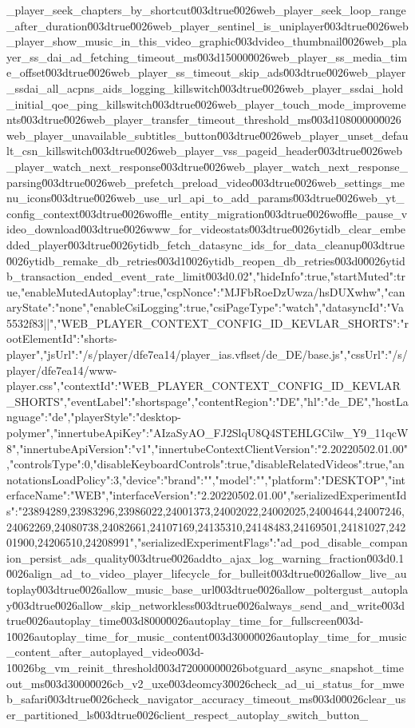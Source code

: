 {_player_seek_chapters_by_shortcut\u003dtrue\u0026web_player_seek_loop_range_after_duration\u003dtrue\u0026web_player_sentinel_is_uniplayer\u003dtrue\u0026web_player_show_music_in_this_video_graphic\u003dvideo_thumbnail\u0026web_player_ss_dai_ad_fetching_timeout_ms\u003d15000\u0026web_player_ss_media_time_offset\u003dtrue\u0026web_player_ss_timeout_skip_ads\u003dtrue\u0026web_player_ssdai_all_acpns_aids_logging_killswitch\u003dtrue\u0026web_player_ssdai_hold_initial_qoe_ping_killswitch\u003dtrue\u0026web_player_touch_mode_improvements\u003dtrue\u0026web_player_transfer_timeout_threshold_ms\u003d10800000\u0026web_player_unavailable_subtitles_button\u003dtrue\u0026web_player_unset_default_csn_killswitch\u003dtrue\u0026web_player_vss_pageid_header\u003dtrue\u0026web_player_watch_next_response\u003dtrue\u0026web_player_watch_next_response_parsing\u003dtrue\u0026web_prefetch_preload_video\u003dtrue\u0026web_settings_menu_icons\u003dtrue\u0026web_use_url_api_to_add_params\u003dtrue\u0026web_yt_config_context\u003dtrue\u0026woffle_entity_migration\u003dtrue\u0026woffle_pause_video_download\u003dtrue\u0026www_for_videostats\u003dtrue\u0026ytidb_clear_embedded_player\u003dtrue\u0026ytidb_fetch_datasync_ids_for_data_cleanup\u003dtrue\u0026ytidb_remake_db_retries\u003d1\u0026ytidb_reopen_db_retries\u003d0\u0026ytidb_transaction_ended_event_rate_limit\u003d0.02","hideInfo":true,"startMuted":true,"enableMutedAutoplay":true,"cspNonce":"MJFbRoeDzUwza/hsDUXwhw","canaryState":"none","enableCsiLogging":true,"csiPageType":"watch","datasyncId":"Va5532f83||"},"WEB_PLAYER_CONTEXT_CONFIG_ID_KEVLAR_SHORTS":{"rootElementId":"shorts-player","jsUrl":"/s/player/dfe7ea14/player_ias.vflset/de_DE/base.js","cssUrl":"/s/player/dfe7ea14/www-player.css","contextId":"WEB_PLAYER_CONTEXT_CONFIG_ID_KEVLAR_SHORTS","eventLabel":"shortspage","contentRegion":"DE","hl":"de_DE","hostLanguage":"de","playerStyle":"desktop-polymer","innertubeApiKey":"AIzaSyAO_FJ2SlqU8Q4STEHLGCilw_Y9_11qcW8","innertubeApiVersion":"v1","innertubeContextClientVersion":"2.20220502.01.00","controlsType":0,"disableKeyboardControls":true,"disableRelatedVideos":true,"annotationsLoadPolicy":3,"device":{"brand":"","model":"","platform":"DESKTOP","interfaceName":"WEB","interfaceVersion":"2.20220502.01.00"},"serializedExperimentIds":"23894289,23983296,23986022,24001373,24002022,24002025,24004644,24007246,24062269,24080738,24082661,24107169,24135310,24148483,24169501,24181027,24201900,24206510,24208991","serializedExperimentFlags":"ad_pod_disable_companion_persist_ads_quality\u003dtrue\u0026addto_ajax_log_warning_fraction\u003d0.1\u0026align_ad_to_video_player_lifecycle_for_bulleit\u003dtrue\u0026allow_live_autoplay\u003dtrue\u0026allow_music_base_url\u003dtrue\u0026allow_poltergust_autoplay\u003dtrue\u0026allow_skip_networkless\u003dtrue\u0026always_send_and_write\u003dtrue\u0026autoplay_time\u003d8000\u0026autoplay_time_for_fullscreen\u003d-1\u0026autoplay_time_for_music_content\u003d3000\u0026autoplay_time_for_music_content_after_autoplayed_video\u003d-1\u0026bg_vm_reinit_threshold\u003d7200000\u0026botguard_async_snapshot_timeout_ms\u003d3000\u0026cb_v2_uxe\u003deomcy3\u0026check_ad_ui_status_for_mweb_safari\u003dtrue\u0026check_navigator_accuracy_timeout_ms\u003d0\u0026clear_user_partitioned_ls\u003dtrue\u0026client_respect_autoplay_switch_button_}
